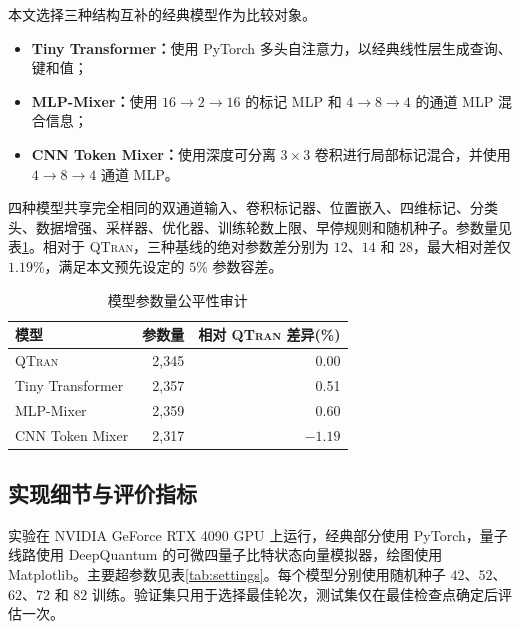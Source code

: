 \documentclass[journal]{IEEEtran}
\newcommand{\qtran}{\textsc{QTran}}
\begin{document}
本文选择三种结构互补的经典模型作为比较对象。

\begin{itemize}[leftmargin=1.5em]
  \item \textbf{Tiny Transformer：}使用 PyTorch 多头自注意力，以经典线性层生成查询、键和值；
  \item \textbf{MLP-Mixer：}使用 $16\rightarrow2\rightarrow16$ 的标记 MLP 和 $4\rightarrow8\rightarrow4$ 的通道 MLP 混合信息；
  \item \textbf{CNN Token Mixer：}使用深度可分离 $3\times3$ 卷积进行局部标记混合，并使用 $4\rightarrow8\rightarrow4$ 通道 MLP。
\end{itemize}

四种模型共享完全相同的双通道输入、卷积标记器、位置嵌入、四维标记、分类头、数据增强、采样器、优化器、训练轮数上限、早停规则和随机种子。参数量见表\ref{tab:param_fairness}。相对于 \qtran{}，三种基线的绝对参数差分别为 $12$、$14$ 和 $28$，最大相对差仅 $1.19\%$，满足本文预先设定的 $5\%$ 参数容差。

\begin{table}[t]
  \centering
  \caption{模型参数量公平性审计}
  \label{tab:param_fairness}
  \begin{tabular}{lrr}
    \toprule
    模型 & 参数量 & 相对 \qtran{} 差异(\%)\\
    \midrule
    \qtran{} & 2,345 & 0.00\\
    Tiny Transformer & 2,357 & 0.51\\
    MLP-Mixer & 2,359 & 0.60\\
    CNN Token Mixer & 2,317 & $-1.19$\\
    \bottomrule
  \end{tabular}
\end{table}

\subsection{实现细节与评价指标}

实验在 NVIDIA GeForce RTX 4090 GPU 上运行，经典部分使用 PyTorch，量子线路使用 DeepQuantum 的可微四量子比特状态向量模拟器\cite{paszke2019pytorch,he2025deepquantum}，绘图使用 Matplotlib。主要超参数见表\ref{tab:settings}。每个模型分别使用随机种子 $42$、$52$、$62$、$72$ 和 $82$ 训练。验证集只用于选择最佳轮次，测试集仅在最佳检查点确定后评估一次。
\end{document}
